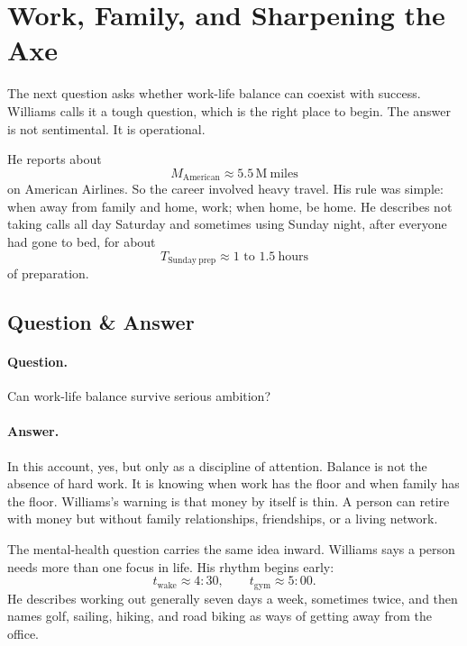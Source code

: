 \section{Work, Family, and Sharpening the Axe}

The next question asks whether work-life balance can coexist with success. Williams calls it a tough question, which is the right place to begin. The answer is not sentimental. It is operational.

He reports about
\begin{equation}
M_{\mathrm{American}} \approx 5.5\,\mathrm{M\ miles}
\end{equation}
on American Airlines. So the career involved heavy travel. His rule was simple: when away from family and home, work; when home, be home. He describes not taking calls all day Saturday and sometimes using Sunday night, after everyone had gone to bed, for about
\begin{equation}
T_{\mathrm{Sunday\ prep}} \approx 1\text{ to }1.5\ \mathrm{hours}
\end{equation}
of preparation.

\subsection{Question \& Answer}

\paragraph{Question.} Can work-life balance survive serious ambition?

\paragraph{Answer.} In this account, yes, but only as a discipline of attention. Balance is not the absence of hard work. It is knowing when work has the floor and when family has the floor. Williams's warning is that money by itself is thin. A person can retire with money but without family relationships, friendships, or a living network.

The mental-health question carries the same idea inward. Williams says a person needs more than one focus in life. His rhythm begins early:
\begin{equation}
t_{\mathrm{wake}} \approx 4{:}30,
\qquad
t_{\mathrm{gym}} \approx 5{:}00.
\end{equation}
He describes working out generally seven days a week, sometimes twice, and then names golf, sailing, hiking, and road biking as ways of getting away from the office.

